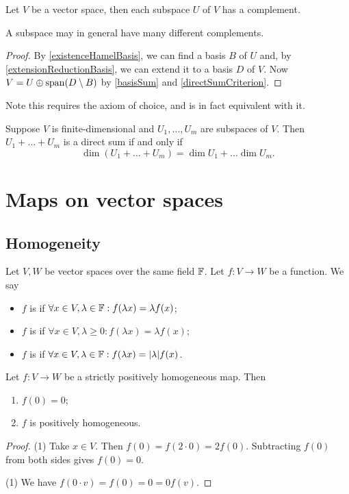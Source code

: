\begin{proposition}
Let $V$ be a vector space, then each subspace $U$ of $V$ has a complement.
\end{proposition}
A subspace may in general have many different complements.
\begin{proof}
By \ref{existenceHamelBasis}, we can find a basis $B$ of $U$ and, by \ref{extensionReductionBasis}, we can extend it to a basis $D$ of $V$. Now $V = U \oplus \operatorname{span}(D\setminus B)$ by \ref{basisSum} and \ref{directSumCriterion}.
\end{proof}
Note this requires the axiom of choice, and is in fact equivalent with it.
\begin{corollary}
Suppose $V$ is finite-dimensional and $U_1,\ldots, U_m$ are subspaces of $V$. Then $U_1+\ldots+ U_m$ is a direct sum \textup{if and only if}
\[ \dim(U_1+\ldots+U_m) = \dim U_1 + \ldots \dim U_m. \]
\end{corollary}


\section{Maps on vector spaces}
\subsection{Homogeneity}
\begin{definition}
Let $V, W$ be vector spaces over the same field $\mathbb{F}$. Let $f: V\to W$ be a function. We say
\begin{itemize}
\item $f$ is  if $\forall x\in V,\lambda\in \mathbb{F}: f(\lambda x) = \lambda f(x)$;
\item $f$ is  if $\forall x\in V,\lambda\geq 0: f(\lambda x) = \lambda f(x)$;
\item $f$ is  if $\forall x\in V,\lambda\in\mathbb{F}: f(\lambda x) = |\lambda| f(x)$.
\end{itemize}
\end{definition}

\begin{lemma} \label{homogeneousFunctionLemma}
Let $f: V\to W$ be a strictly positively homogeneous map. Then
\begin{enumerate}
\item $f(0) = 0$;
\item $f$ is positively homogeneous.
\end{enumerate}
\end{lemma}
\begin{proof}
(1) Take $x\in V$. Then $f(0) = f(2\cdot 0) = 2f(0)$. Subtracting $f(0)$ from both sides gives $f(0) = 0$.

(1) We have $f(0\cdot v) = f(0) = 0 = 0f(v)$.
\end{proof}

